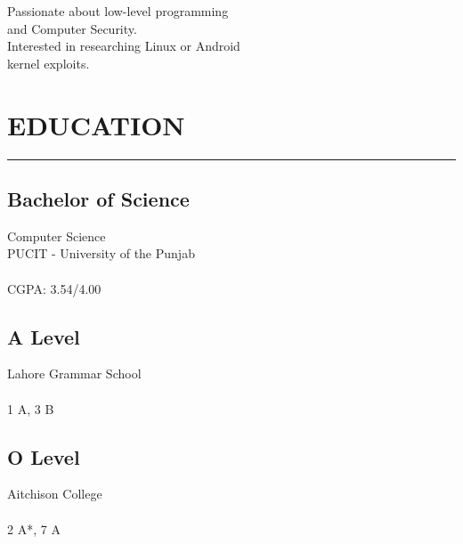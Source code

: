 \documentclass[]{resume}
\begin{document}
%
%

\begin{minipage}[t]{0.33\textwidth}

    \begin{large}
        \\
    \end{large}

    \vspace{4pt}
    \noindent {}\\
    Passionate about low-level programming\\
    and Computer Security.\\
    Interested in researching Linux or Android\\
    kernel exploits.



    \section{EDUCATION}
    \noindent\rule{5cm}{0.4pt}

    \subsection{Bachelor of Science}
    \noindent Computer Science\\
    PUCIT - University of the Punjab\\
    \\
    CGPA: 3.54/4.00

    \vspace{8pt}
    \subsection{A Level}
    \noindent Lahore Grammar School\\
    \\
    1 A, 3 B

    \vspace{8pt}
    \subsection{O Level}
    \noindent Aitchison College\\
    \\
    2 A*, 7 A


\end{minipage}
\end{document}
